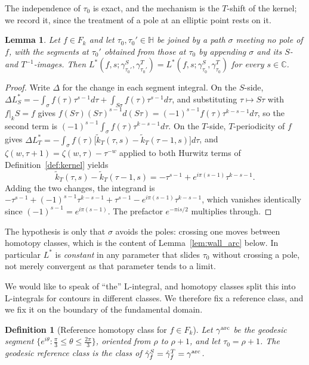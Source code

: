 \documentclass[11pt]{article}
\newtheorem{lemma}[theorem]{Lemma}
\newtheorem{definition}[theorem]{Definition}
\newcommand{\HH}{\mathbb{H}}
\newcommand{\CC}{\mathbb{C}}
\newcommand{\tk}{\widetilde{k}_T}
\begin{document}
The independence of $\tau_0$ is exact, and the mechanism is the $T$-shift of the kernel; we record
it, since the treatment of a pole at an elliptic point rests on it.

\begin{lemma}\label{lem:tau0indep}
Let $f\in F_k$ and let $\tau_0,\tau_0'\in\HH$ be joined by a path $\sigma$ meeting no pole of $f$,
with the segments at $\tau_0'$ obtained from those at $\tau_0$ by appending $\sigma$ and its
$S$- and $T^{-1}$-images. Then
$L^*(f,s;\gamma^S_{\tau_0'},\gamma^T_{\tau_0'})=L^*(f,s;\gamma^S_{\tau_0},\gamma^T_{\tau_0})$ for
every $s\in\CC$.
\end{lemma}

\begin{proof}
Write $\Delta$ for the change in each segment integral. On the $S$-side,
$\Delta L^*_S=-\int_\sigma f(\tau)\tau^{s-1}d\tau+\int_{S\sigma}f(\tau)\tau^{s-1}d\tau$, and
substituting $\tau\mapsto S\tau$ with $f|_kS=f$ gives
$f(S\tau)(S\tau)^{s-1}d(S\tau)=(-1)^{s-1}f(\tau)\tau^{k-s-1}d\tau$, so the second term is
$(-1)^{s-1}\int_\sigma f(\tau)\tau^{k-s-1}d\tau$. On the $T$-side, $T$-periodicity of $f$ gives
$\Delta L^*_T=-\int_\sigma f(\tau)\big[\tk(\tau,s)-\tk(\tau-1,s)\big]d\tau$, and
$\zeta(w,\tau+1)=\zeta(w,\tau)-\tau^{-w}$ applied to both Hurwitz terms of
Definition~\ref{def:kernel} yields
\begin{equation}\label{eq:ktilshift}
\tk(\tau,s)-\tk(\tau-1,s)=-\tau^{s-1}+e^{i\pi(s-1)}\tau^{k-s-1}.
\end{equation}
Adding the two changes, the integrand is
$-\tau^{s-1}+(-1)^{s-1}\tau^{k-s-1}+\tau^{s-1}-e^{i\pi(s-1)}\tau^{k-s-1}$, which vanishes
identically since $(-1)^{s-1}=e^{i\pi(s-1)}$. The prefactor $e^{-\pi is/2}$ multiplies through.
\end{proof}

The hypothesis is only that $\sigma$ avoids the poles: crossing one moves between homotopy
classes, which is the content of Lemma~\ref{lem:wall_arc} below. In particular $L^*$ is
\emph{constant} in any parameter that slides $\tau_0$ without crossing a pole, not merely
convergent as that parameter tends to a limit.

We would like to speak of ``the'' L-integral, and homotopy classes split this into L-integrals for
contours in different classes. We therefore fix a reference class, and we fix it on the boundary of
the fundamental domain.

\begin{definition}[Reference homotopy class for $f \in F_k$]\label{def:georef}
Let $\gamma^{\rm arc}$ be the geodesic segment
$\{e^{i\theta}:\tfrac{\pi}{3}\le\theta\le\tfrac{2\pi}{3}\}$, oriented from $\rho$ to $\rho+1$, and
let $\tau_0=\rho+1$. The \emph{geodesic reference class} is the class of
$\hat\gamma^S_f=\hat\gamma^T_f=\gamma^{\rm arc}$.
\end{definition}
\end{document}
